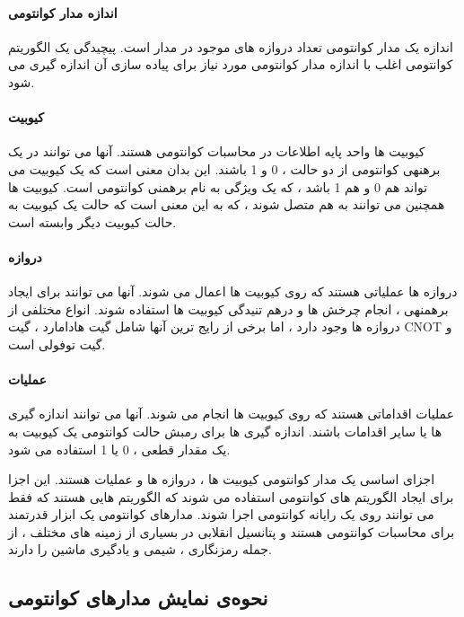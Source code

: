 \documentclass{book}
\begin{document}
\paragraph{اندازه مدار کوانتومی}

اندازه یک مدار کوانتومی تعداد دروازه های موجود در مدار است. پیچیدگی یک الگوریتم کوانتومی اغلب با اندازه مدار کوانتومی مورد نیاز برای پیاده سازی آن اندازه گیری می شود.


\paragraph{کیوبیت}

کیوبیت ها واحد پایه اطلاعات در محاسبات کوانتومی هستند. آنها می توانند در یک برهنهی کوانتومی از دو حالت ، 0 و 1 باشند. این بدان معنی است که یک کیوبیت می تواند هم 0 و هم 1 باشد ، که یک ویژگی به نام برهمنی کوانتومی است. کیوبیت ها همچنین می توانند به هم متصل شوند ، که به این معنی است که حالت یک کیوبیت به حالت کیوبیت دیگر وابسته است.
\paragraph{دروازه}
دروازه ها عملیاتی هستند که روی کیوبیت ها اعمال می شوند. آنها می توانند برای ایجاد برهمنهی ، انجام چرخش ها و درهم تنیدگی کیوبیت ها استفاده شوند. انواع مختلفی از دروازه ها وجود دارد ، اما برخی از رایج ترین آنها شامل گیت هادامارد ، گیت CNOT و گیت توفولی است.

\paragraph{عملیات}

عملیات اقداماتی هستند که روی کیوبیت ها انجام می شوند. آنها می توانند اندازه گیری ها یا سایر اقدامات باشند. اندازه گیری ها برای رمبش حالت کوانتومی یک کیوبیت به یک مقدار قطعی ، 0 یا 1 استفاده می شود.



اجزای اساسی یک مدار کوانتومی کیوبیت ها ، دروازه ها و عملیات هستند. این اجزا برای ایجاد الگوریتم های کوانتومی استفاده می شوند که الگوریتم هایی هستند که فقط می توانند روی یک رایانه کوانتومی اجرا شوند. مدارهای کوانتومی یک ابزار قدرتمند برای محاسبات کوانتومی هستند و پتانسیل انقلابی در بسیاری از زمینه های مختلف ، از جمله رمزنگاری ، شیمی و یادگیری ماشین را دارند.

\subsection{نحوه‌ی نمایش مدار‌های کوانتومی}
\end{document}
